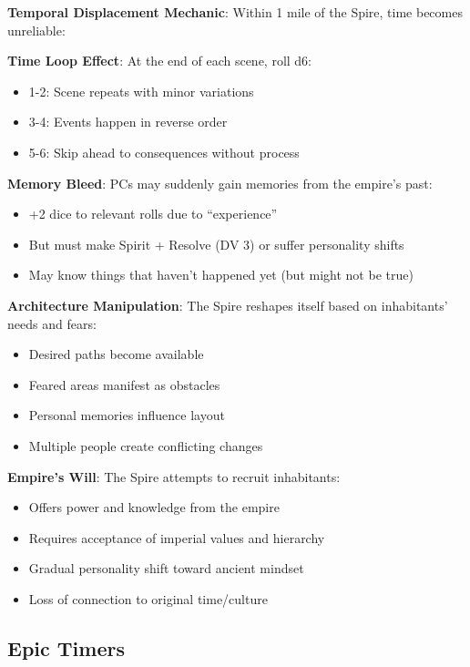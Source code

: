 \documentclass[11pt]{article}
\begin{document}
\begin{mdframed}[backgroundcolor=mechanicbg]
\textbf{Temporal Displacement Mechanic}: Within 1 mile of the Spire, time becomes unreliable:

\textbf{Time Loop Effect}: At the end of each scene, roll d6:
\begin{itemize}[leftmargin=*]
\item 1-2: Scene repeats with minor variations
\item 3-4: Events happen in reverse order
\item 5-6: Skip ahead to consequences without process
\end{itemize}

\textbf{Memory Bleed}: PCs may suddenly gain memories from the empire's past:
\begin{itemize}[leftmargin=*]
\item +2 dice to relevant rolls due to ``experience''
\item But must make Spirit + Resolve (DV 3) or suffer personality shifts
\item May know things that haven't happened yet (but might not be true)
\end{itemize}

\textbf{Architecture Manipulation}: The Spire reshapes itself based on inhabitants' needs and fears:
\begin{itemize}[leftmargin=*]
\item Desired paths become available
\item Feared areas manifest as obstacles
\item Personal memories influence layout
\item Multiple people create conflicting changes
\end{itemize}

\textbf{Empire's Will}: The Spire attempts to recruit inhabitants:
\begin{itemize}[leftmargin=*]
\item Offers power and knowledge from the empire
\item Requires acceptance of imperial values and hierarchy
\item Gradual personality shift toward ancient mindset
\item Loss of connection to original time/culture
\end{itemize}
\end{mdframed}

\subsection*{Epic Timers}
\end{document}
